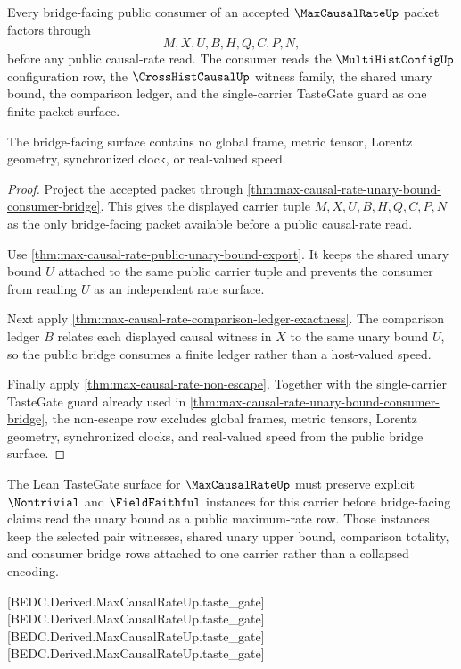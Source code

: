 \begin{theorem}
\label{thm:max-causal-rate-bridge-consumer-surface}
Every bridge-facing public consumer of an accepted $\MaxCausalRateUp$ packet
factors through
$$
M,X,U,B,H,Q,C,P,N,
$$
before any public causal-rate read. The consumer reads the
$\MultiHistConfigUp$ configuration row, the $\CrossHistCausalUp$ witness
family, the shared unary bound, the comparison ledger, and the single-carrier
TasteGate guard as one finite packet surface.

The bridge-facing surface contains no global frame, metric tensor, Lorentz
geometry, synchronized clock, or real-valued speed.
\end{theorem}
\begin{proof}
Project the accepted packet through
\autoref{thm:max-causal-rate-unary-bound-consumer-bridge}. This gives the
displayed carrier tuple $M,X,U,B,H,Q,C,P,N$ as the only bridge-facing packet
available before a public causal-rate read.

Use \autoref{thm:max-causal-rate-public-unary-bound-export}. It keeps the
shared unary bound $U$ attached to the same public carrier tuple and prevents
the consumer from reading $U$ as an independent rate surface.

Next apply \autoref{thm:max-causal-rate-comparison-ledger-exactness}. The
comparison ledger $B$ relates each displayed causal witness in $X$ to the same
unary bound $U$, so the public bridge consumes a finite ledger rather than a
host-valued speed.

Finally apply \autoref{thm:max-causal-rate-non-escape}. Together with the
single-carrier TasteGate guard already used in
\autoref{thm:max-causal-rate-unary-bound-consumer-bridge}, the non-escape row
excludes global frames, metric tensors, Lorentz geometry, synchronized clocks,
and real-valued speed from the public bridge surface.
\end{proof}

The Lean TasteGate surface for $\MaxCausalRateUp$ must preserve explicit $\Nontrivial$ and $\FieldFaithful$ instances for this carrier before bridge-facing claims read the unary bound as a public maximum-rate row. Those instances keep the selected pair witnesses, shared unary upper bound, comparison totality, and consumer bridge rows attached to one carrier rather than a collapsed encoding.

[BEDC.Derived.MaxCausalRateUp.taste\_gate]
[BEDC.Derived.MaxCausalRateUp.taste\_gate]
[BEDC.Derived.MaxCausalRateUp.taste\_gate]
[BEDC.Derived.MaxCausalRateUp.taste\_gate]

